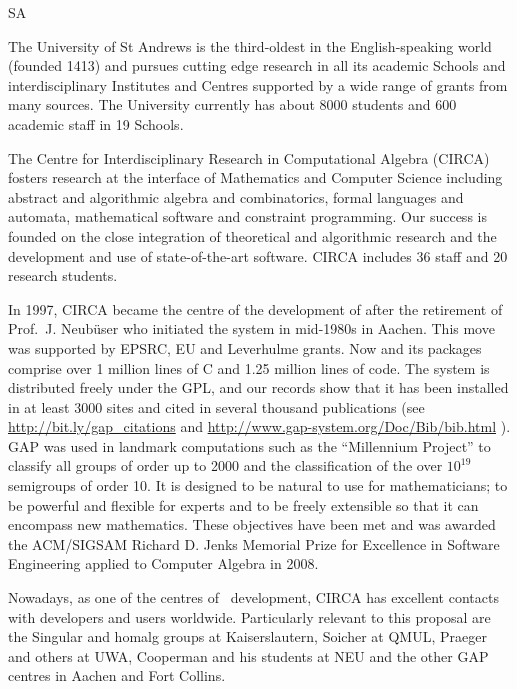 \begin{sitedescription}{SA}

% 


The University of St Andrews is the third-oldest in the
English-speaking world (founded 1413) and pursues cutting edge
research in all its academic Schools and interdisciplinary Institutes
and Centres supported by a wide range of grants from many sources. 
The University currently has about 8000 students and 600
academic staff in 19 Schools.

The Centre for Interdisciplinary Research in Computational Algebra (CIRCA)
fosters research at the interface of Mathematics and Computer Science including
abstract and algorithmic algebra and combinatorics, formal languages and
automata, mathematical software and constraint programming. Our success is 
founded on the close integration of theoretical and algorithmic research and 
the development and use of state-of-the-art software. CIRCA includes
36 staff and 20 research students.

In 1997, CIRCA became the centre of the development of \GAP after the 
retirement of Prof.~J. Neub\"user who initiated the system in 
mid-1980s in Aachen. This move was supported by EPSRC, EU and Leverhulme 
grants. Now \GAP and its packages comprise over 1 million lines of C and 
1.25 million lines of \GAP code. The system is distributed freely under the GPL,
and our records show that it has been installed in at least 3000 sites and 
cited in several thousand publications 
(see \url{http://bit.ly/gap_citations} and \url{http://www.gap-system.org/Doc/Bib/bib.html} ). 
GAP was used in landmark computations such as the ``Millennium Project'' 
to classify all groups of order up to 2000 
and the classification of the over $10^{19}$ semigroups of order 10. It is 
designed to be natural to use for mathematicians; to be powerful and flexible 
for experts and to be freely extensible so that it can encompass new mathematics. 
These objectives have been met and \GAP was awarded the ACM/SIGSAM Richard D. Jenks
Memorial Prize for Excellence in Software Engineering applied to Computer Algebra in 2008.

Nowadays, as one of the centres of \GAP\ development, CIRCA has
excellent contacts with developers and users worldwide. Particularly 
relevant to this proposal are the Singular and homalg groups at 
Kaiserslautern, Soicher at QMUL, Praeger and others at UWA, Cooperman 
and his students at NEU and the other GAP centres in Aachen and Fort Collins.


\end{sitedescription}
